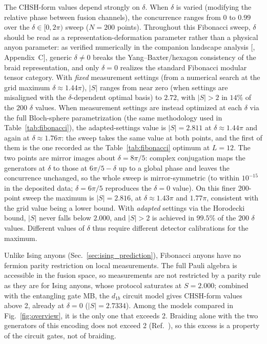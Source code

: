 \documentclass[aps,pra,twocolumn,superscriptaddress,showpacs,floatfix]{revtex4-2}
\begin{document}
The CHSH-form values depend strongly on $\delta$. When $\delta$ is varied
(modifying the relative phase between fusion channels),
the concurrence ranges from $0$ to $0.99$ over the
$\delta\in[0,2\pi)$ sweep ($N=200$ points). Throughout this Fibonacci sweep,
$\delta$ should be read as a representation-deformation parameter rather than
a physical anyon parameter: as verified numerically in the companion landscape
analysis [\cite{Sayim2026fibonacci}, Appendix~C], generic $\delta\neq0$ breaks
the Yang--Baxter/hexagon consistency of the braid representation, and only
$\delta=0$ realizes the standard Fibonacci modular tensor category. With \emph{fixed} measurement
settings (from a numerical search at the grid maximum $\delta\approx
1.44\pi$), $|S|$ ranges from near zero (when settings are misaligned with the
$\delta$-dependent optimal basis) to $2.72$, with $|S| > 2$ in $14\%$ of the
$200$ $\delta$ values.
When measurement settings are instead optimized at each $\delta$ via the full
Bloch-sphere parametrization (the same methodology used in
Table~\ref{tab:fibonacci}), the adapted-settings value is $|S|=2.811$
at $\delta\approx 1.44\pi$ and again at $\delta\approx 1.76\pi$: the sweep
takes the same value at both points, and the first of them is the one recorded
as the Table~\ref{tab:fibonacci} optimum at $L=12$. The two points are mirror
images about $\delta = 8\pi/5$: complex conjugation maps the generators at
$\delta$ to those at $6\pi/5 - \delta$ up to a global phase and leaves the
concurrence unchanged, so the whole sweep is mirror-symmetric (to within
$10^{-15}$ in the deposited data; $\delta = 6\pi/5$ reproduces the $\delta =
0$ value). On this finer 200-point sweep the maximum is $|S| = 2.816$, at
$\delta \approx 1.43\pi$ and $1.77\pi$, consistent with the grid value being a
lower bound.
With \emph{adapted}
settings via the Horodecki bound, $|S|$ never falls below $2.000$, and
$|S| > 2$ is achieved in $99.5\%$ of the $200$ $\delta$ values. Different
values of $\delta$ thus require different detector calibrations for the
maximum.

Unlike Ising anyons (Sec.~\ref{sec:ising_prediction}), Fibonacci anyons have no
fermion parity restriction on local measurements. The full Pauli algebra is
accessible in the fusion space, so measurements are not restricted by a parity
rule as they are for Ising anyons, whose protocol saturates at $S = 2.000$;
combined with the entangling gate MB, the $d_{1b}$ circuit model gives
CHSH-form values above 2, already at $\delta = 0$ ($|S| = 2.7334$). Among the
models compared in Fig.~\ref{fig:overview}, it is the only one that exceeds 2.
Braiding alone with the two generators of this encoding does not exceed 2
(Ref.~\cite{Sayim2026fibonacci}), so this excess is a property of the circuit
gates, not of braiding.
\end{document}
